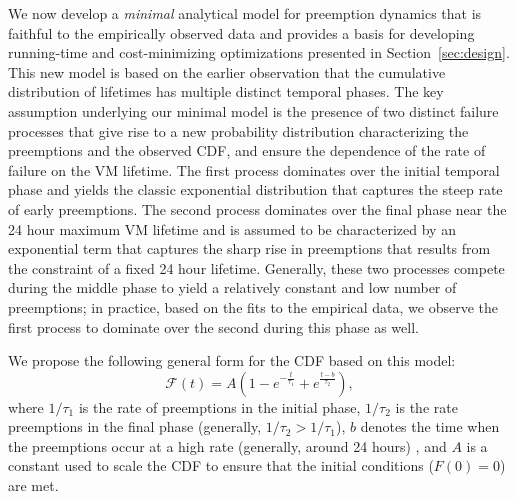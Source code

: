 We now develop a \emph{minimal} analytical model for preemption dynamics that is faithful to the empirically observed data and provides a basis for developing running-time and cost-minimizing optimizations presented in Section~\ref{sec:design}.
This new model is based on the earlier observation that the cumulative distribution of lifetimes has multiple distinct temporal phases. The key assumption underlying our minimal model is the presence of two distinct failure processes that give rise to a new probability distribution characterizing the preemptions and the observed CDF, and ensure the dependence of the rate of failure on the VM lifetime. The first process dominates over the initial temporal phase and yields the classic exponential distribution that captures the steep rate of early preemptions. The second process dominates over the final phase near the 24 hour maximum VM lifetime and is assumed to be characterized by an exponential term that captures the sharp rise in preemptions that results from the constraint of a fixed 24 hour lifetime. Generally, these two processes compete during the middle phase to yield a relatively constant and low number of preemptions; in practice, based on the fits to the empirical data, we observe the first process to dominate over the second during this phase as well. 

%
%

We propose the following general form for the CDF based on this model:
\begin{equation}
  \label{eq:blend1}
  \mathscr{F}\left(t\right) = A\left(1-e^{-\frac{t}{\tau_1}} + e^{\frac{t-b}{\tau_2}}\right),
\end{equation}
where $1/\tau_1$ is the rate of preemptions in the initial phase, $1/\tau_2$ is the rate preemptions in the final phase (generally, $1/\tau_2 > 1/\tau_1$), $b$ denotes the time when the preemptions occur at a high rate (generally, around 24 hours) , and $A$ is a constant used to scale the CDF to ensure that the initial conditions ($F(0)=0$) are met.

